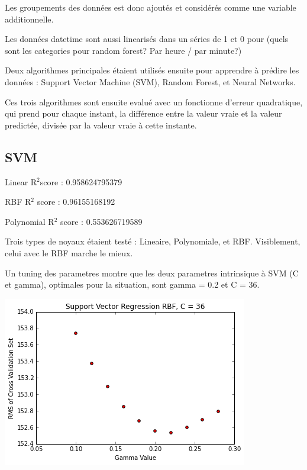 \documentclass[a4paper]{article}
\begin{document}
\begin{multicols}{2}
Les groupements des données est donc ajoutés et considérés comme une variable additionnelle. 

Les données datetime sont aussi linearisés dans un séries de 1 et 0 pour (quels sont les categories pour random forest? Par heure / par minute?)

Deux algorithmes principales étaient utilisés ensuite pour apprendre à prédire les données : Support Vector Machine (SVM), Random Forest, et Neural Networks.

Ces trois algorithmes sont ensuite evalué avec un fonctionne d'erreur quadratique, qui prend pour chaque instant, la différence entre la valeur vraie et la valeur predictée, divisée par la valeur vraie à cette instante. 

\subsection{SVM}
Linear R$^{2} $score : 0.958624795379

RBF R$^{2}$ score : 0.96155168192

Polynomial R$^{2}$ score : 0.553626719589

Trois types de noyaux étaient testé : Lineaire, Polynomiale, et RBF. Visiblement, celui avec le RBF marche le mieux.

Un tuning des parametres montre que les deux parametres intrinsique à SVM (C et gamma), optimales pour la situation, sont gamma = 0.2 et C = 36. 

\includegraphics[width=\textwidth/2]{./svmselectgamma.png}


\end{multicols}
\end{document}
